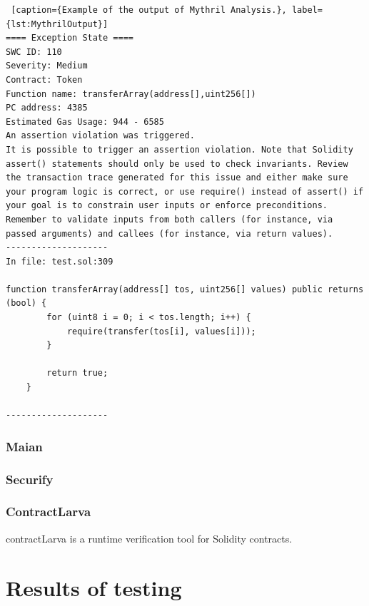 \begin{lstlisting} [caption={Example of the output of Mythril Analysis.}, label={lst:MythrilOutput}]
==== Exception State ====
SWC ID: 110
Severity: Medium
Contract: Token
Function name: transferArray(address[],uint256[])
PC address: 4385
Estimated Gas Usage: 944 - 6585
An assertion violation was triggered.
It is possible to trigger an assertion violation. Note that Solidity assert() statements should only be used to check invariants. Review the transaction trace generated for this issue and either make sure your program logic is correct, or use require() instead of assert() if your goal is to constrain user inputs or enforce preconditions. Remember to validate inputs from both callers (for instance, via passed arguments) and callees (for instance, via return values).
--------------------
In file: test.sol:309

function transferArray(address[] tos, uint256[] values) public returns (bool) {
        for (uint8 i = 0; i < tos.length; i++) {
            require(transfer(tos[i], values[i]));
        }

        return true;
    }

--------------------

\end{lstlisting}

\subsection{Maian}
\label{sec:WithoutSpecification:Maian}

\subsection{Securify}
\label{sec:WithoutSpecification:Securify}

\subsection{ContractLarva}
\label{sec:WithoutSpecification:ContractLarva}
contractLarva is a runtime verification tool for Solidity contracts. 

\chapter{Results of testing}
\label{ch:Results}

